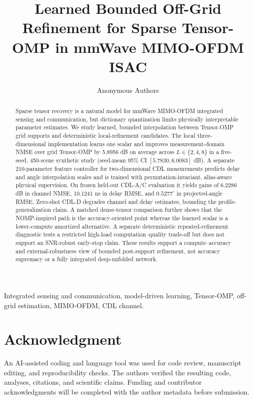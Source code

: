 \documentclass[journal]{IEEEtran}
\title{Learned Bounded Off-Grid Refinement for Sparse Tensor-OMP in mmWave MIMO-OFDM ISAC}
\author{Anonymous Authors}
\begin{document}
\maketitle
{}

\begin{abstract}
Sparse tensor recovery is a natural model for mmWave MIMO-OFDM integrated sensing and communication, but dictionary quantization limits physically interpretable parameter estimates. We study learned, bounded interpolation between Tensor-OMP grid supports and deterministic local-refinement candidates. The local three-dimensional implementation learns one scalar and improves measurement-domain NMSE over grid Tensor-OMP by 5.8956 dB on average across $L\in\{2,4,8\}$ in a five-seed, 450-scene synthetic study (seed-mean 95\% CI $[5.7830,6.0083]$ dB). A separate 210-parameter feature controller for two-dimensional CDL measurements predicts delay and angle interpolation scales and is trained with permutation-invariant, alias-aware physical supervision. On frozen held-out CDL-A/C evaluation it yields gains of 6.2286 dB in channel NMSE, 10.1241 ns in delay RMSE, and $0.5277^\circ$ in projected-angle RMSE. Zero-shot CDL-D degrades channel and delay estimates, bounding the profile-generalization claim. A matched dense-tensor comparison further shows that the NOMP-inspired path is the accuracy-oriented point whereas the learned scalar is a lower-compute amortized alternative. A separate deterministic repeated-refinement diagnostic tests a restricted high-load computation--quality trade-off but does not support an SNR-robust early-stop claim. These results support a compute--accuracy and external-robustness view of bounded post-support refinement, not accuracy supremacy or a fully integrated deep-unfolded network.
\end{abstract}
\begin{IEEEkeywords}
Integrated sensing and communication, model-driven learning, Tensor-OMP, off-grid estimation, MIMO-OFDM, CDL channel.
\end{IEEEkeywords}










\section*{Acknowledgment}
An AI-assisted coding and language tool was used for code review, manuscript editing, and reproducibility checks. The authors verified the resulting code, analyses, citations, and scientific claims. Funding and contributor acknowledgments will be completed with the author metadata before submission.

\appendices





\end{document}
